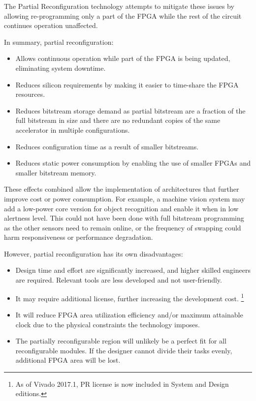 The Partial Reconfiguration technology attempts to mitigate these issues by allowing re-programming
only a part of the FPGA while the rest of the circuit continues operation unaffected.

In summary, partial reconfiguration:

\begin{itemize}
\item	Allows continuous operation while part of the FPGA is being updated, eliminating system downtime.
\item	Reduces silicon requirements by making it easier to time-share the FPGA resources. 
\item	Reduces bitstream storage demand as partial bitstream are a fraction of the full bitstream in size
	and there are no redundant copies of the same accelerator in multiple configurations.
\item	Reduces configuration time as a result of smaller bitstreams.
\item	Reduces static power consumption by enabling the use of smaller FPGAs and smaller bitstream memory.
\end{itemize}

These effects combined allow the implementation of architectures that further improve cost or power consumption.
For example, a machine vision system may add a low-power core version for object recognition
and enable it when in low alertness level. 
This could not have been done with full bitstream programming as the other
sensors need to remain online, or the frequency of swapping could harm responsiveness or performance degradation.

However, partial reconfiguration has its own disadvantages:

\begin{itemize}
\item	Design time and effort are significantly increased, and higher skilled engineers are required.
	Relevant tools are less developed and not user-friendly.
\item	It may require additional license, further increasing the development cost.
	\footnote{As of Vivado 2017.1, PR license is now included in System and Design editions.}
\item	It will reduce FPGA area utilization efficiency and/or maximum attainable clock
	due to the physical constraints the technology imposes.
\item	The partially reconfigurable region will unlikely be a perfect fit for all reconfigurable modules.
	If the designer cannot divide their tasks evenly, additional FPGA area will be lost.
\end{itemize}

